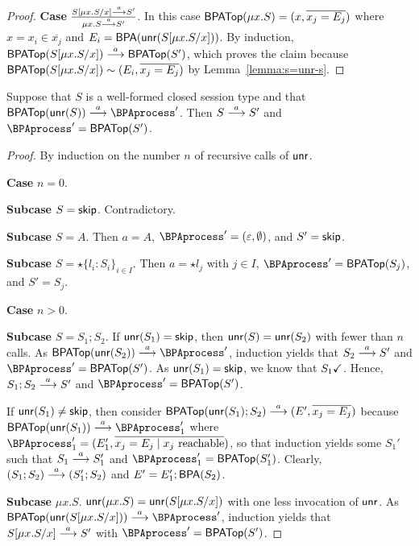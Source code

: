 \begin{proof}
  \begin{sloppypar}
    \textbf{Case
    }$\frac{S[\mu x.S/x] \stackrel{a}{\longrightarrow} S'}{\mu x.S \stackrel{a}{\longrightarrow} S'}$.  In
    this case $\mathsf{BPATop} (\mu x.S) = (x, \overline{x_j = E_j})$ where
    $x=x_i \in \overline{x_j}$ and
    $E_i = \mathsf{BPA} (\mathsf{unr} (S[\mu x.S/x]))$.  By induction,
    $\mathsf{BPATop} (S[\mu x.S/x]) \stackrel{a}{\longrightarrow} \mathsf{BPATop} (S')$, which proves
    the claim because
    $\mathsf{BPATop} (S[\mu x.S/x]) \sim (E_i, \overline{x_j = E_j})$
    by Lemma~\ref{lemma:s=unr-s}.
  \end{sloppypar}
\end{proof}

\begin{lemma}\label{lemma:bpa-unr-s}
  Suppose that $S$ is a well-formed closed session type and that $\toBPATop{\Unravel
    (S)} \LTSderives \BPAprocess'$. Then $S \stackrel{a}{\longrightarrow} S'$
  and $\BPAprocess' = \toBPATop{S'}$.
\end{lemma}
\begin{proof}
  By induction on the number $n$ of recursive calls of $\mathsf{unr}$.

  \textbf{Case }$n=0$.

  \textbf{Subcase }$S=\mathsf{skip}$. Contradictory.

  \textbf{Subcase }$S=A$. Then $a=A$, $\BPAprocess'=(\varepsilon, \emptyset)$, and $S' =
  \mathsf{skip}$.

  \textbf{Subcase }$S = \star\{l_i\colon S_i\}_{i\in I}$. Then $a = \star
  l_j$ with $j\in I$, $\BPAprocess'= \toBPATop{S_j}$, and $S' = S_j$.

  \textbf{Case }$n>0$.

  \textbf{Subcase }$S = S_1;S_2$.
  If $\mathsf{unr} (S_1) = \mathsf{skip}$, then $\mathsf{unr} (S) = \mathsf{unr}
  (S_2)$ with fewer than $n$ calls. As $\toBPATop{\Unravel (S_2)} \LTSderives \BPAprocess'$, induction yields
  that $S_2 \stackrel{a}{\longrightarrow} S'$ and $\BPAprocess' = \toBPATop{S'}$.
  As $\mathsf{unr} (S_1) = \mathsf{skip}$, we know that $S_1 \checkmark$. Hence,
  ${S_1;S_2} \stackrel{a}{\longrightarrow} S'$ and $\BPAprocess' = \toBPATop{S'}$.

  If $\mathsf{unr} (S_1)\ne \mathsf{skip}$, then consider $\mathsf{BPATop} (\mathsf{unr}({S_1});
    S_2) \stackrel{a}{\longrightarrow} (E',\overline{x_j=E_j})$ because $\toBPATop{\Unravel({S_1})} \LTSderives
  \BPAprocess_1'$ where $\BPAprocess_1' = (E_1', \overline{x_j = E_j \mid x_j \text{ reachable}})$,
  so that induction yields some $S_1'$ such that $S_1 
  \stackrel{a}{\longrightarrow} S_1'$ and $\BPAprocess_1' = \toBPATop{S_1'}$.
  Clearly, $(S_1; S_2) \stackrel{a}{\longrightarrow} (S_1'; S_2)$ and $E' = E_1'; \mathsf{BPA} (S_2)$.

  \textbf{Subcase }$\mu x.S$.
  $\mathsf{unr} (\mu x.S) = \mathsf{unr} (S[\mu x.S/x])$ with one less
  invocation of $\mathsf{unr}$. As $\toBPATop{\Unravel (S[\mu x.S/x])}
  \LTSderives \BPAprocess'$, induction yields that  $S[\mu x.S/x] \stackrel{a}{\longrightarrow}
  S'$ with $\BPAprocess' = \toBPATop{S'} $.
\end{proof}

